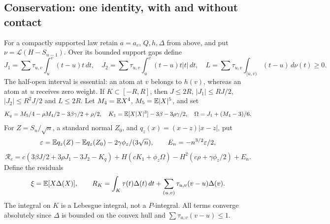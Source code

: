 \subsection{Conservation: one identity, with and without contact}
For a compactly supported law retain $a=a_c$, $Q,h,\Delta$ from above,
and put $\nu=\mathcal L(H-S_{n-1})$. Over its bounded support gaps define
\[
 J_1=\sum\tau_{u,v}\!\int_u^v(t-u)t\,dt,\quad
 J_2=\sum\tau_{u,v}\!\int_u^v(t-u)t|t|\,dt,\quad
 L=\sum\tau_{u,v}\!\int_{[u,v)}(t-u)\,d\nu(t)\ge0.
\]
The half-open interval is essential: an atom at $v$ belongs to $h(v)$,
whereas an atom at $u$ receives zero weight. If $K\subset[-R,R]$, then
$J\le2R$, $|J_1|\le RJ/2$, $|J_2|\le R^2J/2$ and $L\le2R$.
Let $M_4=\mathbb E X^4$, $M_5=\mathbb E|X|^5$, and set
\[
 K_q=M_5/4-\rho M_4/2-3\beta\gamma/2+\rho/2,\quad
 K_1=\mathbb E[X|X|^3]-3\beta-3\rho\gamma/2,\quad
 \Omega=J_1+(M_4-3)/6.
\]
For $Z=S_n/\sqrt n$, a standard normal $Z_0$, and $q_z(x)=(x-z)|x-z|$, put
\[
 \varepsilon=\mathbb E q_z(Z)-\mathbb E q_z(Z_0)-2\gamma\phi_z/(3\sqrt n),\qquad
 E_n=-n^{3/2}\varepsilon/2,
\]
\begin{equation}\label{j:core:remainder}
 \mathcal R_c=c(3\beta J/2+3\rho J_1-3J_2-K_q)
 +H(cK_1+\phi_z\Omega)-H^2(c\rho+\gamma\phi_z/2)+E_n.
\end{equation}
Define the residuals
\[
 \xi=\mathbb E[X\Delta(X)],\qquad
 R_K=\int_K\tau(t)\Delta(t)\,dt
       +\sum_{(u,v)}\tau_{u,v}(v-u)\Delta(v).
\]
The integral on $K$ is a Lebesgue integral, not a $P$-integral. All terms
converge absolutely since $\Delta$ is bounded on the convex hull and
$\sum\tau_{u,v}(v-u)\le1$.

